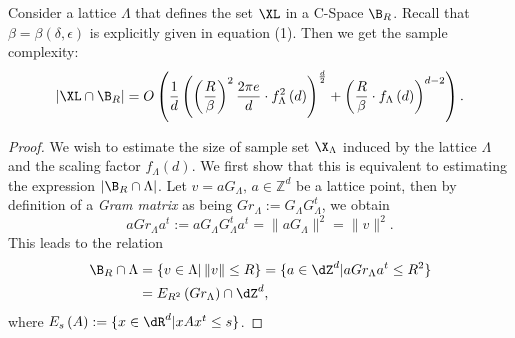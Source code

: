 \begin{thm}
\label{general_sample_complexity}
    Consider a lattice $\Lambda$ that defines the \decomp set $\XL$ in a C-Space $\B_R$. Recall that $\beta=\beta\left(\delta,\epsilon\right)$ is explicitly given in equation (1). Then we get the sample complexity:
    \begin{align*}
        |\XL\cap \B_R| = O\left(\frac{1}{d}\left(\left(\frac{R}{\beta}\right)^2\frac{2\pi e}{d}\cdot f_\Lambda^2\left(d\right)\right)^{\frac{d}{2}} + \left(\frac{R}{\beta}\cdot f_\Lambda\left(d\right)\right)^{d-2}\right).
    \end{align*}
\end{thm}
\begin{proof}
  We wish to estimate the size of sample set $\X_\Lambda$ induced by the lattice $\Lambda$ and the scaling factor $f_\Lambda\left(d\right)$. We first show that this is equivalent to estimating the expression $|\B_R\cap \Lambda|$. Let $v=aG_\Lambda,\,a\in\mathbb{Z}^d$ be a lattice point, then by definition of a \emph{Gram matrix} as being $Gr_\Lambda:=G_\Lambda G_\Lambda^t$, we obtain 
  \[
    aGr_\Lambda a^t:=aG_\Lambda G^t_\Lambda a^t=\|aG_\Lambda\|^2=\|v\|^2.
  \]
  This leads to the relation
  \begin{align*}
      \B_R\cap \Lambda &= \{v\in\Lambda |\,\|v\| \leq R\} =\{a\in\dZ^d|a Gr_\Lambda a^t\leq R^2\} \\ & =E_{R^2}\left(Gr_\Lambda\right)\cap \dZ^d,
  \end{align*}
  where $E_{s}\left(A\right):=\{x\in\dR^d|x A x^t\leq s\}$. 
  

\end{proof}
